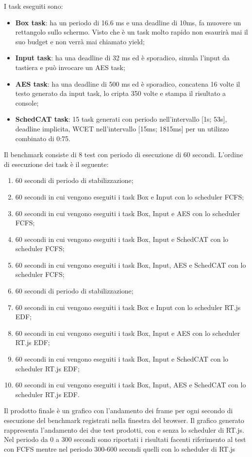 \documentclass[conference]{IEEEtran}
\begin{document}
\begin{itemize}
    I task eseguiti sono: 
    \begin{itemize}
        \item \textbf{Box task}: ha un periodo di 16.6 ms e una deadline di 10ms, fa muovere un rettangolo sullo schermo. Visto che è un task molto rapido non esaurirà mai il suo budget e non verrà mai chiamato yield;
        \item \textbf{Input task}: ha una deadline di 32 ms ed è sporadico, simula l'input da tastiera e può invocare un AES task;
        \item \textbf{AES task}: ha una deadline di 500 ms ed è sporadico, concatena 16 volte il testo generato da input task, lo cripta 350 volte e stampa il risultato a console;
        \item \textbf{SchedCAT task}: 15 task generati con periodo nell'intervallo [1s; 53s], deadline implicita, WCET nell'intervallo [15ms; 1815ms] per un utilizzo combinato di 0:75.
    \end{itemize}
    Il benchmark consiste di 8 test con periodo di esecuzione di 60 secondi. L'ordine di esecuzione dei task è il seguente:
    \begin{enumerate}
        \item 60 secondi di periodo di stabilizzazione;
        \item 60 secondi in cui vengono eseguiti i task Box e Input con lo scheduler FCFS;
        \item 60 secondi in cui vengono eseguiti i task Box, Input e AES con lo scheduler FCFS;
        \item 60 secondi in cui vengono eseguiti i task Box, Input e SchedCAT con lo scheduler FCFS;
        \item 60 secondi in cui vengono eseguiti i task Box, Input, AES e SchedCAT con lo scheduler FCFS;
        \item 60 secondi di periodo di stabilizzazione;
        \item 60 secondi in cui vengono eseguiti i task Box e Input con lo scheduler RT.js EDF;
        \item 60 secondi in cui vengono eseguiti i task Box, Input e AES con lo scheduler RT.js EDF;
        \item 60 secondi in cui vengono eseguiti i task Box, Input e SchedCAT con lo scheduler RT.js EDF;
        \item 60 secondi in cui vengono eseguiti i task Box, Input, AES e SchedCAT con lo scheduler RT.js EDF.
    \end{enumerate}
    Il prodotto finale è un grafico con l'andamento dei frame per ogni secondo di esecuzione del benchmark registrati nella finestra del browser. Il grafico generato rappresenta l'andamento dei due test prodotti, con e senza lo scheduler di RT.js. Nel periodo da 0 a 300 secondi sono riportati i risultati facenti riferimento al test con FCFS mentre nel periodo 300-600 secondi quelli con lo scheduler di RT.js
\end{itemize}
\end{document}
